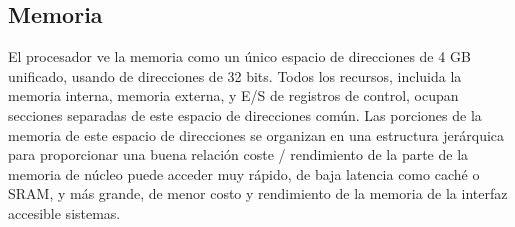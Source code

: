 \subsection{Memoria}

El procesador ve la memoria como un único espacio de direcciones de 4 GB unificado, usando de direcciones de 32 bits. Todos los recursos, incluida la memoria interna, memoria externa, y E/S de registros de control, ocupan secciones separadas de este espacio de direcciones común. Las porciones de la memoria de este espacio de direcciones se organizan en una estructura jerárquica para proporcionar una buena relación coste / rendimiento de la parte de la memoria de núcleo puede acceder muy rápido, de baja latencia como caché o SRAM, y más grande, de menor costo y rendimiento de la memoria de la interfaz accesible sistemas.






